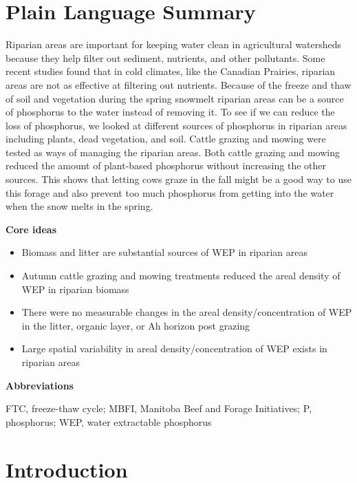 \documentclass[
]{agujournal2019}
\providecommand{\tightlist}{%
  \setlength{\itemsep}{0pt}\setlength{\parskip}{0pt}}\usepackage{longtable,booktabs,array}
\begin{document}
\section*{Plain Language Summary}
Riparian areas are important for keeping water clean in agricultural
watersheds because they help filter out sediment, nutrients, and other
pollutants. Some recent studies found that in cold climates, like the
Canadian Prairies, riparian areas are not as effective at filtering out
nutrients. Because of the freeze and thaw of soil and vegetation during
the spring snowmelt riparian areas can be a source of phosphorus to the
water instead of removing it. To see if we can reduce the loss of
phosphorus, we looked at different sources of phosphorus in riparian
areas including plants, dead vegetation, and soil. Cattle grazing and
mowing were tested as ways of managing the riparian areas. Both cattle
grazing and mowing reduced the amount of plant-based phosphorus without
increasing the other sources. This shows that letting cows graze in the
fall might be a good way to use this forage and also prevent too much
phosphorus from getting into the water when the snow melts in the
spring.




\textbf{Core ideas}

\begin{itemize}
\tightlist
\item
  Biomass and litter are substantial sources of WEP in riparian areas
\item
  Autumn cattle grazing and mowing treatments reduced the areal density
  of WEP in riparian biomass
\item
  There were no measurable changes in the areal density/concentration of
  WEP in the litter, organic layer, or Ah horizon post grazing
\item
  Large spatial variability in areal density/concentration of WEP exists
  in riparian areas
\end{itemize}

\textbf{Abbreviations}

FTC, freeze-thaw cycle; MBFI, Manitoba Beef and Forage Initiatives; P,
phosphorus; WEP, water extractable phosphorus

\section{Introduction}\label{introduction}
\end{document}
